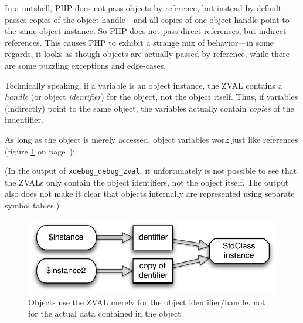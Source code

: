 In a nutshell, PHP does not pass objects by reference, but instead by default passes copies of the object handle---and all copies of one object handle point to the same object instance. So PHP does not pass direct references, but indirect references. This causes PHP to exhibit a strange mix of behavior---in some regards, it looks as though objects are actually passed by reference, while there are some puzzling exceptions and edge-cases.

Technically speaking, if a variable is an object instance, the ZVAL contains a \emph{handle} (or object \emph{identifier}) for the object, not the object itself. Thus, if variables (indirectly) point to the same object, the variables actually contain \emph{copies} of the indentifier.~\cite{php-manual-oop-references}

As long as the object is merely accessed, object variables work just like references (figure \ref{fig:objects-as-references} on page~\pageref{fig:objects-as-references}):



(In the output of \texttt{xdebug\_debug\_zval}, it unfortunately is not possible to see that the ZVALs only contain the object identifiers, not the object itself. The output also does not make it clear that objects internally are represented using separate symbol tables.)

\begin{figure}[htb]
  \begin{center}
    \includegraphics[scale=0.8]{images/instance_instance2}
    \caption{Objects use the ZVAL merely for the object identifier/handle, not for the actual data contained in the object.}
    \label{fig:objects-as-references}
  \end{center}
\end{figure}

